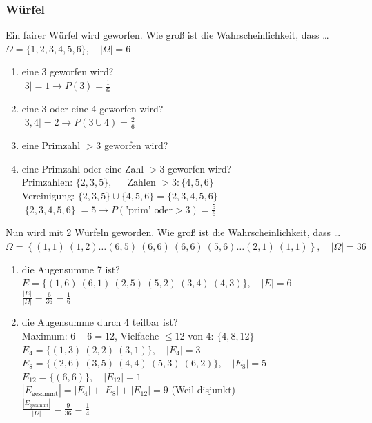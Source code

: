 \documentclass[11pt, a4paper]{article}
\newcommand{\abs}[1]{\left\lvert#1\right\rvert}
\begin{document}
\subsubsection{Würfel}
Ein fairer Würfel wird geworfen. Wie groß ist die Wahrscheinlichkeit, dass \dots \\
$\Omega = \{1,2,3,4,5,6\}, \quad \abs{\Omega} = 6$
\begin{enumerate}
	\item eine 3 geworfen wird? \\
	$\abs{3} = 1 \rightarrow P(3) = \frac{1}{6}$
	\item eine 3 oder eine 4 geworfen wird? \\
	$\abs{3, 4} = 2 \rightarrow P(3 \cup 4) = \frac{2}{6}$
	\item eine Primzahl $> 3$ geworfen wird?
	\item eine Primzahl oder eine Zahl $> 3$ geworfen wird? \\
	Primzahlen: $\{2,3,5\}$, $\quad$ Zahlen $> 3: \{4,5,6\}$ \\
	Vereinigung: $\{2,3,5\} \cup \{4,5,6\} = \{2,3,4,5,6\}$ \\
	$\abs{\{2,3,4,5,6\}} = 5 \rightarrow P(\text{'prim' oder} >3) = \frac{5}{6}$
\end{enumerate}
Nun wird mit 2 Würfeln geworden. Wie groß ist die Wahrscheinlichkeit, dass \dots \\
$\Omega = \left\{(1,1)\ (1,2)\dots (6,5)\ (6,6)\ (6,6)\ (5,6)\dots (2,1)\ (1,1)\right\}, \quad \abs{\Omega} = 36$
\begin{enumerate}
	\item die Augensumme 7 ist? \\
	$E = \{(1,6)\ (6,1)\ (2,5)\ (5,2)\ (3,4)\ (4,3)\}, \quad \abs{E} = 6$ \\
	$\frac{\abs{E}}{\abs{\Omega}} = \frac{6}{36} = \frac{1}{6}$
	\item die Augensumme durch 4 teilbar ist? \\
	Maximum: $6+6 = 12$, Vielfache $\leq 12$ von 4: $\{4, 8, 12\}$ \\
	$E_4 = \{(1,3)\ (2,2)\ (3,1)\}, \quad \abs{E_4} = 3$ \\
	$E_8 = \{(2,6)\ (3,5)\ (4,4)\ (5,3)\ (6,2)\}, \quad \abs{E_8} = 5$ \\
	$E_{12} = \{(6,6)\}, \quad \abs{E_{12}} = 1$ \\
	$\abs{E_{\text{gesammt}}} = \abs{E_4} + \abs{E_8} + \abs{E_{12}} = 9$ (Weil disjunkt) \\
	$\frac{\abs{E_{\text{gesammt}}}}{\abs{\Omega}} = \frac{9}{36} = \frac{1}{4}$
\end{enumerate}
\end{document}
